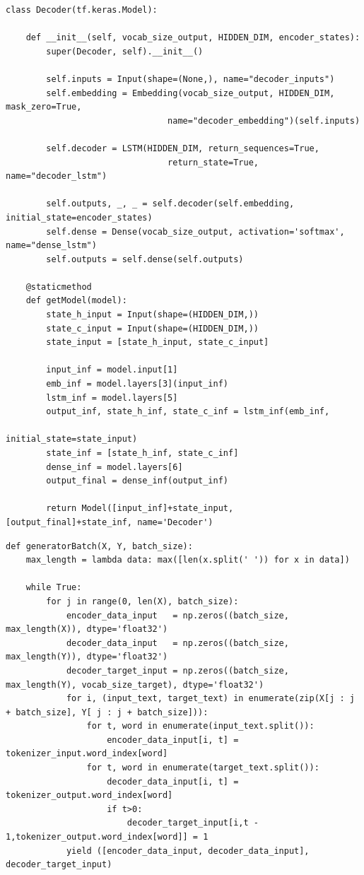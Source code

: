 	\begin{lstlisting}[language=iPython]
class Decoder(tf.keras.Model):

    def __init__(self, vocab_size_output, HIDDEN_DIM, encoder_states):
        super(Decoder, self).__init__()

        self.inputs = Input(shape=(None,), name="decoder_inputs")
        self.embedding = Embedding(vocab_size_output, HIDDEN_DIM, mask_zero=True, 
                                name="decoder_embedding")(self.inputs)
        
        self.decoder = LSTM(HIDDEN_DIM, return_sequences=True, 
                                return_state=True, name="decoder_lstm")
                                    
        self.outputs, _, _ = self.decoder(self.embedding, initial_state=encoder_states)
        self.dense = Dense(vocab_size_output, activation='softmax', name="dense_lstm")
        self.outputs = self.dense(self.outputs)
    
    @staticmethod
    def getModel(model):
        state_h_input = Input(shape=(HIDDEN_DIM,))
        state_c_input = Input(shape=(HIDDEN_DIM,))
        state_input = [state_h_input, state_c_input]

        input_inf = model.input[1]
        emb_inf = model.layers[3](input_inf)
        lstm_inf = model.layers[5]
        output_inf, state_h_inf, state_c_inf = lstm_inf(emb_inf, 
                                                    initial_state=state_input)
        state_inf = [state_h_inf, state_c_inf]
        dense_inf = model.layers[6]
        output_final = dense_inf(output_inf)

        return Model([input_inf]+state_input, [output_final]+state_inf, name='Decoder') \end{lstlisting}

\begin{lstlisting}[language=iPython]
def generatorBatch(X, Y, batch_size):
    max_length = lambda data: max([len(x.split(' ')) for x in data])
    
    while True:
        for j in range(0, len(X), batch_size):
            encoder_data_input   = np.zeros((batch_size, max_length(X)), dtype='float32')
            decoder_data_input   = np.zeros((batch_size, max_length(Y)), dtype='float32')
            decoder_target_input = np.zeros((batch_size, max_length(Y), vocab_size_target), dtype='float32')
            for i, (input_text, target_text) in enumerate(zip(X[j : j + batch_size], Y[ j : j + batch_size])):
                for t, word in enumerate(input_text.split()):
                    encoder_data_input[i, t] = tokenizer_input.word_index[word]
                for t, word in enumerate(target_text.split()):
                    decoder_data_input[i, t] = tokenizer_output.word_index[word]
                    if t>0:
                        decoder_target_input[i,t - 1,tokenizer_output.word_index[word]] = 1
            yield ([encoder_data_input, decoder_data_input], decoder_target_input)
\end{lstlisting}
	\clearpage
	
